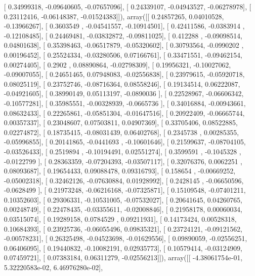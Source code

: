 \documentclass{article}
\begin{document}
       [ 0.34999318, -0.09640605, -0.07657096],
       [ 0.24339107, -0.04943527, -0.06278978],
       [ 0.23112416, -0.06148387, -0.01524383]]), array([[ 0.24857265,  0.04010528, -0.13966267],
       [ 0.3603549 , -0.04541557, -0.10914501],
       [ 0.42411586, -0.0383914 , -0.12108485],
       [ 0.24469481, -0.03832872, -0.09811025],
       [ 0.412288  , -0.09098514,  0.04801638],
       [ 0.35398463, -0.06517879, -0.05320602],
       [ 0.30793564, -0.0990202 ,  0.00196452],
       [ 0.25524334, -0.03280506,  0.07166761],
       [ 0.33471551, -0.09462154,  0.00274405],
       [ 0.2902    ,  0.08890864, -0.02798309],
       [ 0.19956321, -0.10027062, -0.09007055],
       [ 0.24651465,  0.07948083, -0.02556838],
       [ 0.23979615, -0.05920718,  0.08025119],
       [ 0.23752746, -0.08716364,  0.08558246],
       [ 0.19134514,  0.06222087, -0.04921605],
       [ 0.38990149,  0.05113197, -0.0890036 ],
       [ 0.22528967, -0.06606342, -0.10577281],
       [ 0.35985551, -0.00328939, -0.0665736 ],
       [ 0.34016884, -0.00943661,  0.08632433],
       [ 0.22265861, -0.05851304, -0.01647516],
       [ 0.20922409, -0.06665744,  0.00357337],
       [ 0.23048607,  0.07503811,  0.04907369],
       [ 0.33705406,  0.08522885,  0.02274872],
       [ 0.18735415, -0.08031439,  0.06402768],
       [ 0.2345738 ,  0.00285355, -0.05996855],
       [ 0.20141865, -0.0441693 , -0.10601646],
       [ 0.21599637, -0.08704105, -0.03526433],
       [ 0.2519894 , -0.10194491,  0.02551274],
       [ 0.3599591 , -0.1045328 , -0.0122799 ],
       [ 0.28363359, -0.07204393, -0.03507117],
       [ 0.32076376,  0.0062251 ,  0.08093687],
       [ 0.19654433,  0.09088478,  0.09316793],
       [ 0.158654  , -0.00669252, -0.05002318],
       [ 0.32462126, -0.07630884,  0.01928992],
       [ 0.2428145 , -0.06650596, -0.0628499 ],
       [ 0.21973248, -0.06216168, -0.07325871],
       [ 0.15109548, -0.07401211,  0.10352603],
       [ 0.29306331, -0.10531005, -0.07532027],
       [ 0.20641645,  0.04260765,  0.00248749],
       [ 0.22478435, -0.03355611, -0.02008846],
       [ 0.21958178,  0.00060034,  0.03515074],
       [ 0.19289158,  0.0784529 ,  0.09211931],
       [ 0.14173424,  0.00528318,  0.10684393],
       [ 0.23925736, -0.06055496,  0.09835321],
       [ 0.23724121, -0.09121562, -0.00578231],
       [ 0.26325498, -0.04523698, -0.01629556],
       [ 0.09890059, -0.02556251,  0.06406095],
       [ 0.19440832, -0.10082191,  0.02935773],
       [ 0.10579414, -0.03124909,  0.07459721],
       [ 0.07383184,  0.06311279, -0.02556213]]), array([[ -4.38061754e-01,   5.32220583e-02,   6.46976280e-02],
\end{document}
